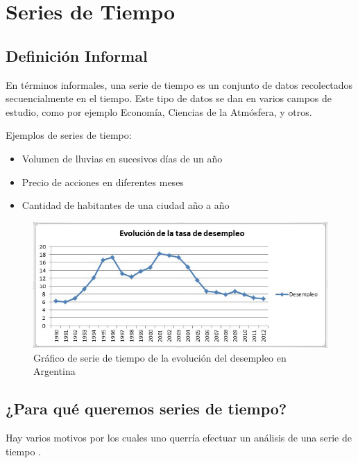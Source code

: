 \section{Series de Tiempo}
\label{sec:time_series}

\theoremstyle{definition}
\newtheorem{definicion}{Definición}

\subsection*{Definición Informal}
En términos informales, una serie de tiempo es un conjunto de datos recolectados secuencialmente en el tiempo. Este tipo de datos se dan en varios campos de estudio, como por ejemplo Economía, Ciencias de la Atmósfera, y otros.

Ejemplos de series de tiempo:

\begin{itemize}
    \item Volumen de lluvias en sucesivos días de un año
    \item Precio de acciones en diferentes meses
    \item Cantidad de habitantes de una ciudad año a año
\end{itemize}

\begin{figure}
\centering
\includegraphics[width=15cm]{images/desocupacion.jpg}
\caption{Gráfico de serie de tiempo de la evolución del desempleo en Argentina \label{desocupacion}}
\end{figure}


\subsection*{¿Para qué queremos series de tiempo?}

Hay varios motivos por los cuales uno querría efectuar un análisis de una serie de tiempo \cite{CHATFIELD}.

